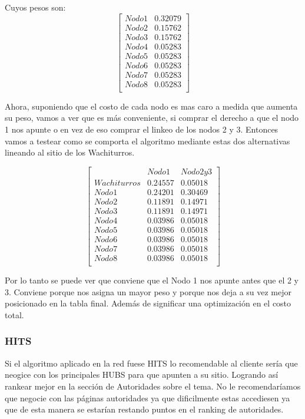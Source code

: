 Cuyos pesos son:
   $$ 
\begin{bmatrix}
Nodo 1 & 0.32079\\
Nodo 2 & 0.15762\\
Nodo 3 & 0.15762\\
Nodo 4 & 0.05283\\
Nodo 5 & 0.05283\\
Nodo 6 & 0.05283\\
Nodo 7 & 0.05283\\
Nodo 8 & 0.05283\\
\end{bmatrix} 
$$

Ahora, suponiendo que el costo de cada nodo es mas caro a medida que aumenta su peso, vamos a ver que es más conveniente, si comprar el derecho a que el nodo 1 nos apunte o en vez de eso comprar el linkeo de los nodos 2 y 3. Entonces vamos a testear como se comporta el algoritmo mediante estas dos alternativas lineando al sitio de los Wachiturros.


   $$ 
\begin{bmatrix}
 & Nodo 1 & Nodo 2 y 3 \\
Wachiturros & 0.24557  & 0.05018   \\
Nodo 1 & 0.24201& 0.30469\\
Nodo 2 & 0.11891& 0.14971\\
Nodo 3 & 0.11891& 0.14971\\
Nodo 4 & 0.03986  & 0.05018\\
Nodo 5 & 0.03986  & 0.05018\\
Nodo 6 & 0.03986  & 0.05018\\
Nodo 7 & 0.03986 & 0.05018\\
Nodo 8 & 0.03986 & 0.05018\\
\end{bmatrix} 
$$

Por lo tanto se puede ver que conviene que el Nodo 1 nos apunte antes que el 2 y 3. Conviene porque nos asigna un mayor peso y porque nos deja a su vez mejor posicionado en la tabla final. Además de significar una optimización en el costo total.

\subsubsection{HITS}
Si el algoritmo aplicado en la red fuese HITS lo recomendable al cliente sería que neogice con los principales HUBS para que apunten a su sitio. Logrando así rankear mejor en la sección de Autoridades sobre el tema. No le recomendaríamos que negocie con las páginas autoridades ya que dificilmente estas accediesen ya que de esta manera se estarían restando puntos en el ranking de autoridades.

